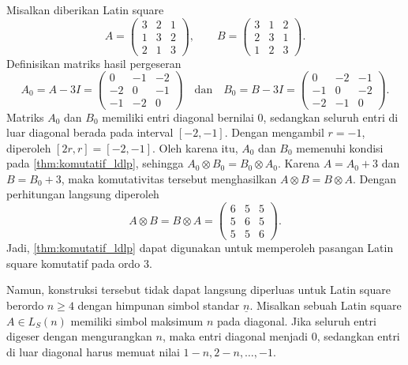 \begin{contoh}\label{contoh:teorema_alhussaini_ordo_3}
  Misalkan diberikan Latin square
  \[
    A=
    \begin{pmatrix}
      3 & 2 & 1 \\
      1 & 3 & 2 \\
      2 & 1 & 3
    \end{pmatrix},
    \qquad
    B=
    \begin{pmatrix}
      3 & 1 & 2 \\
      2 & 3 & 1 \\
      1 & 2 & 3
    \end{pmatrix}.
  \]
  Definisikan matriks hasil pergeseran
  \[
    A_0=A-3I=
    \begin{pmatrix}
      0  & -1 & -2 \\
      -2 & 0  & -1 \\
      -1 & -2 & 0
    \end{pmatrix}
    \quad\text{dan}
    \quad
    B_0=B-3I=
    \begin{pmatrix}
      0  & -2 & -1 \\
      -1 & 0  & -2 \\
      -2 & -1 & 0
    \end{pmatrix}.
  \]
  Matriks $A_0$ dan $B_0$ memiliki entri diagonal bernilai $0$, sedangkan
  seluruh entri di luar diagonal berada pada interval $[-2,-1]$. Dengan
  mengambil $r=-1$, diperoleh $[2r,r]=[-2,-1]$. Oleh karena itu, $A_0$ dan
  $B_0$ memenuhi kondisi pada \autoref{thm:komutatif_ldlp}, sehingga
  $A_0\otimes B_0=B_0\otimes A_0$.
  Karena $A=A_0+3$ dan $B=B_0+3$, maka komutativitas tersebut menghasilkan
  $A\otimes B=B\otimes A$. Dengan perhitungan langsung diperoleh
  \[
    A\otimes B
    =
    B\otimes A
    =
    \begin{pmatrix}
      6 & 5 & 5 \\
      5 & 6 & 5 \\
      5 & 5 & 6
    \end{pmatrix}.
  \]
  Jadi, \autoref{thm:komutatif_ldlp} dapat digunakan untuk memperoleh pasangan Latin square komutatif pada ordo $3$.
\end{contoh}

Namun, konstruksi tersebut tidak dapat langsung diperluas untuk Latin square
berordo $n\ge 4$ dengan himpunan simbol standar $\underline{n}$. Misalkan
sebuah Latin square $A\in L_S(n)$ memiliki simbol maksimum $n$ pada diagonal.
Jika seluruh entri digeser dengan mengurangkan $n$, maka entri diagonal
menjadi $0$, sedangkan entri di luar diagonal harus memuat nilai
$1-n,2-n,\ldots,-1$.

